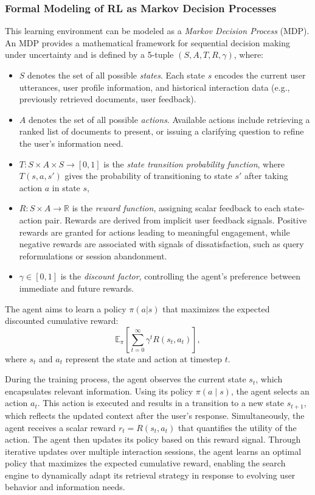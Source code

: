 \subsubsection{Formal Modeling of RL as Markov Decision Processes}
This learning environment can be modeled as a \textit{Markov Decision Process} (MDP). An MDP provides a mathematical framework for sequential decision making under uncertainty and is defined by a 5-tuple $(S, A, T, R, \gamma)$, where:
\begin{itemize}
    \item $S$ denotes the set of all possible \textit{states}. Each state $s$ encodes the current user utterances, user profile information, and historical interaction data (e.g., previously retrieved documents, user feedback).
    \item $A$ denotes the set of all possible \textit{actions}. Available actions include retrieving a ranked list of documents to present, or issuing a clarifying question to refine the user's information need.
    \item $T: S \times A \times S \rightarrow [0,1]$ is the \textit{state transition probability function}, where $T(s, a, s')$ gives the probability of transitioning to state $s'$ after taking action $a$ in state $s$,
    \item $R: S \times A \rightarrow \mathbb{R}$ is the \textit{reward function}, assigning scalar feedback to each state-action pair. Rewards are derived from implicit user feedback signals. Positive rewards are granted for actions leading to meaningful engagement, while negative rewards are associated with signals of dissatisfaction, such as query reformulations or session abandonment.
    \item $\gamma \in [0,1]$ is the \textit{discount factor}, controlling the agent's preference between immediate and future rewards.
\end{itemize}

The agent aims to learn a policy $\pi(a|s)$ that maximizes the expected discounted cumulative reward:
\[
\mathbb{E}_\pi \left[ \sum_{t=0}^{\infty} \gamma^t R(s_t, a_t) \right],
\]
where $s_t$ and $a_t$ represent the state and action at timestep $t$.

During the training process, the agent observes the current state $s_t$, which encapsulates relevant information. Using its policy $\pi(a \mid s)$, the agent selects an action $a_t$. This action is executed and results in a transition to a new state $s_{t+1}$, which reflects the updated context after the user’s response. Simultaneously, the agent receives a scalar reward $r_t = R(s_t, a_t)$ that quantifies the utility of the action. The agent then updates its policy based on this reward signal. Through iterative updates over multiple interaction sessions, the agent learns an optimal policy that maximizes the expected cumulative reward, enabling the search engine to dynamically adapt its retrieval strategy in response to evolving user behavior and information needs.

